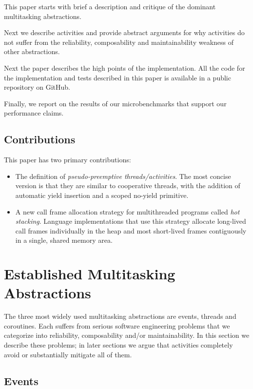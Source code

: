 \documentclass[10pt,preprint]{sigplanconf}
\begin{document}
This paper starts with brief a description and critique of the dominant multitasking abstractions.

Next we describe activities and provide abstract arguments for why activities do not suffer from the reliability, composability and maintainability weakness of other abstractions.

Next the paper describes the high points of the \charcoal{} implementation.
All the code for the implementation and tests described in this paper is available in a public repository on GitHub.

Finally, we report on the results of our microbenchmarks that support our performance claims.

\subsection{Contributions}

This paper has two primary contributions:

\begin{itemize}
\item The definition of \emph{pseudo-preemptive threads/activities}.
The most concise version is that they are similar to cooperative threads, with the addition of automatic yield insertion and a scoped no-yield primitive.
\item A new call frame allocation strategy for multithreaded programs called \emph{hot stacking}.
Language implementations that use this strategy allocate long-lived call frames individually in the heap and most short-lived frames contiguously in a single, shared memory area.
\end{itemize}

\section{Established Multitasking Abstractions}

The three most widely used multitasking abstractions are events, threads and coroutines.
Each suffers from serious software engineering problems that we categorize into reliability, composability and/or maintainability.
In this section we describe these problems; in later sections we argue that activities completely avoid or substantially mitigate all of them.

\subsection{Events}
\end{document}
